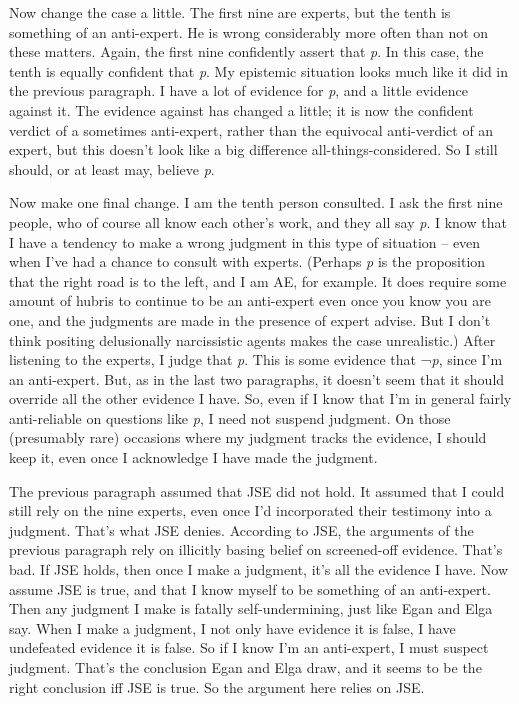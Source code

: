\documentclass[
  10pt,
  letterpaper,
  DIV=11,
  numbers=noendperiod,
  twoside]{scrartcl}
\begin{document}
Now change the case a little. The first nine are experts, but the tenth
is something of an anti-expert. He is wrong considerably more often than
not on these matters. Again, the first nine confidently assert that
\emph{p}. In this case, the tenth is equally confident that \emph{p}. My
epistemic situation looks much like it did in the previous paragraph. I
have a lot of evidence for \emph{p}, and a little evidence against it.
The evidence against has changed a little; it is now the confident
verdict of a sometimes anti-expert, rather than the equivocal
anti-verdict of an expert, but this doesn't look like a big difference
all-things-considered. So I still should, or at least may, believe
\emph{p}.

Now make one final change. I am the tenth person consulted. I ask the
first nine people, who of course all know each other's work, and they
all say \emph{p}. I know that I have a tendency to make a wrong judgment
in this type of situation -- even when I've had a chance to consult with
experts. (Perhaps \emph{p} is the proposition that the right road is to
the left, and I am AE, for example. It does require some amount of
hubris to continue to be an anti-expert even once you know you are one,
and the judgments are made in the presence of expert advise. But I don't
think positing delusionally narcissistic agents makes the case
unrealistic.) After listening to the experts, I judge that \emph{p}.
This is some evidence that ¬\emph{p}, since I'm an anti-expert. But, as
in the last two paragraphs, it doesn't seem that it should override all
the other evidence I have. So, even if I know that I'm in general fairly
anti-reliable on questions like \emph{p}, I need not suspend judgment.
On those (presumably rare) occasions where my judgment tracks the
evidence, I should keep it, even once I acknowledge I have made the
judgment.

The previous paragraph assumed that JSE did not hold. It assumed that I
could still rely on the nine experts, even once I'd incorporated their
testimony into a judgment. That's what JSE denies. According to JSE, the
arguments of the previous paragraph rely on illicitly basing belief on
screened-off evidence. That's bad. If JSE holds, then once I make a
judgment, it's all the evidence I have. Now assume JSE is true, and that
I know myself to be something of an anti-expert. Then any judgment I
make is fatally self-undermining, just like Egan and Elga say. When I
make a judgment, I not only have evidence it is false, I have undefeated
evidence it is false. So if I know I'm an anti-expert, I must suspect
judgment. That's the conclusion Egan and Elga draw, and it seems to be
the right conclusion iff JSE is true. So the argument here relies on
JSE.
\end{document}
